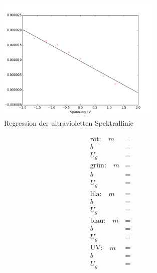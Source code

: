 \begin{figure}[h!]
	\centering
	\includegraphics[width=0.7\textwidth]{build/regression_Farbe:4.png}
	\caption{Regression der ultravioletten Spektrallinie}
	\label{fig:regression_uv}
\end{figure}


\begin{align}
	\text{rot:} \quad m &=  \\
		b &=  \\
		U_g &=  \\
	\text{grün:} \quad m &=  \\
	b &=  \\
	U_g &=  \\
	\text{lila:} \quad m &=  \\
	b &=  \\
	U_g &=  \\
	\text{blau:} \quad m &=  \\
	b &=  \\
	U_g &=  \\
	\text{UV:} \quad m &=  \\
	b &=  \\
	U_g &= 
\end{align}


